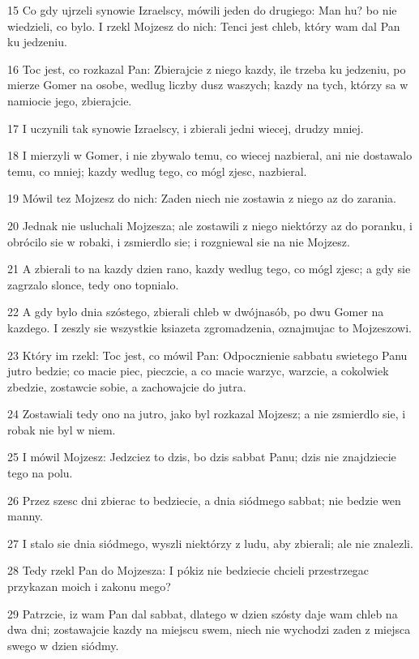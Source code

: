\par 15 Co gdy ujrzeli synowie Izraelscy, mówili jeden do drugiego: Man hu? bo nie wiedzieli, co bylo. I rzekl Mojzesz do nich: Tenci jest chleb, który wam dal Pan ku jedzeniu.
\par 16 Toc jest, co rozkazal Pan: Zbierajcie z niego kazdy, ile trzeba ku jedzeniu, po mierze Gomer na osobe, wedlug liczby dusz waszych; kazdy na tych, którzy sa w namiocie jego, zbierajcie.
\par 17 I uczynili tak synowie Izraelscy, i zbierali jedni wiecej, drudzy mniej.
\par 18 I mierzyli w Gomer, i nie zbywalo temu, co wiecej nazbieral, ani nie dostawalo temu, co mniej; kazdy wedlug tego, co mógl zjesc, nazbieral.
\par 19 Mówil tez Mojzesz do nich: Zaden niech nie zostawia z niego az do zarania.
\par 20 Jednak nie usluchali Mojzesza; ale zostawili z niego niektórzy az do poranku, i obrócilo sie w robaki, i zsmierdlo sie; i rozgniewal sie na nie Mojzesz.
\par 21 A zbierali to na kazdy dzien rano, kazdy wedlug tego, co mógl zjesc; a gdy sie zagrzalo slonce, tedy ono topnialo.
\par 22 A gdy bylo dnia szóstego, zbierali chleb w dwójnasób, po dwu Gomer na kazdego. I zeszly sie wszystkie ksiazeta zgromadzenia, oznajmujac to Mojzeszowi.
\par 23 Który im rzekl: Toc jest, co mówil Pan: Odpocznienie sabbatu swietego Panu jutro bedzie; co macie piec, pieczcie, a co macie warzyc, warzcie, a cokolwiek zbedzie, zostawcie sobie, a zachowajcie do jutra.
\par 24 Zostawiali tedy ono na jutro, jako byl rozkazal Mojzesz; a nie zsmierdlo sie, i robak nie byl w niem.
\par 25 I mówil Mojzesz: Jedzciez to dzis, bo dzis sabbat Panu; dzis nie znajdziecie tego na polu.
\par 26 Przez szesc dni zbierac to bedziecie, a dnia siódmego sabbat; nie bedzie wen manny.
\par 27 I stalo sie dnia siódmego, wyszli niektórzy z ludu, aby zbierali; ale nie znalezli.
\par 28 Tedy rzekl Pan do Mojzesza: I pókiz nie bedziecie chcieli przestrzegac przykazan moich i zakonu mego?
\par 29 Patrzcie, iz wam Pan dal sabbat, dlatego w dzien szósty daje wam chleb na dwa dni; zostawajcie kazdy na miejscu swem, niech nie wychodzi zaden z miejsca swego w dzien siódmy.
